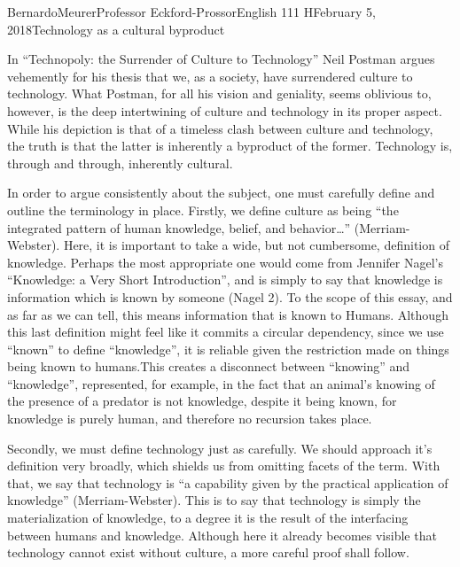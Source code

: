 \documentclass[12pt,letterpaper]{article}
\begin{document}
\begin{mla}{Bernardo}{Meurer}{Professor Eckford-Prossor}{English 111 H}{February 5, 2018}{Technology as a cultural byproduct}

    In ``Technopoly: the Surrender of Culture to Technology'' Neil Postman argues vehemently for his thesis that we, as a society, have surrendered culture to technology. What Postman, for all his vision and geniality, seems oblivious to, however, is the deep intertwining of culture and technology in its proper aspect. While his depiction is that of a timeless clash between culture and technology, the truth is that the latter is inherently a byproduct of the former. Technology is, through and through, inherently cultural.

    In order to argue consistently about the subject, one must carefully define and outline the terminology in place. Firstly, we define culture as being ``the integrated pattern of human knowledge, belief, and behavior\ldots'' (Merriam-Webster). Here, it is important to take a wide, but not cumbersome, definition of knowledge. Perhaps the most appropriate one would come from Jennifer Nagel's ``Knowledge: a Very Short Introduction'', and is simply to say that knowledge is information which is known by someone (Nagel 2). To the scope of this essay, and as far as we can tell, this means information that is known to Humans. Although this last definition might feel like it commits a circular dependency, since we use ``known'' to define ``knowledge'', it is reliable given the restriction made on things being known to humans.This creates a disconnect between ``knowing'' and ``knowledge'', represented, for example, in the fact that an animal's knowing of the presence of a predator is not knowledge, despite it being known, for knowledge is purely human, and therefore no recursion takes place.

    Secondly, we must define technology just as carefully. We should approach it's definition very broadly, which shields us from omitting facets of the term. With that, we say that technology is ``a capability given by the practical application of knowledge'' (Merriam-Webster). This is to say that technology is simply the materialization of knowledge, to a degree it is the result of the interfacing between humans and knowledge. Although here it already becomes visible that technology cannot exist without culture, a more careful proof shall follow.


\end{mla}
\end{document}
